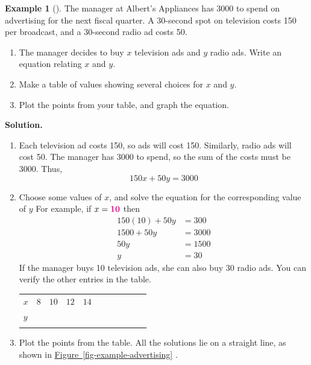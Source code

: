 \documentclass[10pt,]{book}
\theoremstyle{plain}
\theoremstyle{definition}
\theoremstyle{definition}
\newtheorem{example}[theorem]{Example}
\theoremstyle{definition}
\numberwithin{equation}{part}
\newcommand{\hrulethin}  {\noalign{\hrule height 0.04em}}
\newcommand{\hrulethick} {\noalign{\hrule height 0.11em}}
\newcommand{\alert}[1]{\boldsymbol{\color{magenta}{#1}}}
\newcommand{\amp}{&}
\begin{document}
\begin{example}[]\label{example-advertising}
The manager at Albert's Appliances has \textdollar{}3000 to spend on advertising for the next fiscal quarter.  A 30-second spot on television costs \textdollar{}150 per broadcast, and a 30-second radio ad costs \textdollar{}50.%
\leavevmode%
\begin{enumerate}[label=\alph*]
\item\hypertarget{li-45}{}The manager decides to buy \(x\) television ads and \(y\) radio ads.  Write an equation relating \(x\) and \(y\).%
\item\hypertarget{li-46}{}Make a table of values showing several choices for \(x\) and \(y\).%
\item\hypertarget{li-47}{}Plot the points from your table, and graph the equation.%
\end{enumerate}
\par\medskip\noindent%
\textbf{Solution.}\quad \leavevmode%
\begin{enumerate}[label=\alph*]
\item\hypertarget{li-48}{}Each television ad costs \textdollar{}150, so ads will cost \textdollar{}150.  Similarly, radio ads will cost \textdollar{}50.  The manager has \textdollar{}3000 to spend, so the sum of the costs must be \textdollar{}3000.  Thus,%
\begin{equation*}
150x+50y=3000
\end{equation*}
%
\item\hypertarget{li-49}{}Choose some values of \(x\), and solve the equation for the corresponding value of \(y\)  For example, if \(x=\alert{10}\) then%
\begin{align*}
150(10)+50y\amp=300\\
1500+50y\amp=3000\\
50y\amp=1500\\
y\amp=30
\end{align*}
If the manager buys 10 television ads, she can also buy 30 radio ads.  You can verify the other entries in the table.%
\leavevmode%
\begin{table}
\centering
\begin{tabular}{AcAcAcAcAcA}\hrulethick
\(x\)&\(8\)&\(10\)&\(12\)&\(14\)\tabularnewline\hrulethin
\(y\)&&&&\tabularnewline\hrulethin
\end{tabular}
\end{table}
\item\hypertarget{li-50}{}Plot the points from the table.  All the solutions lie on a straight line, as shown in \hyperref[fig-example-advertising]{Figure~\ref{fig-example-advertising}} . \leavevmode%

\end{enumerate}
\end{example}
\end{document}
